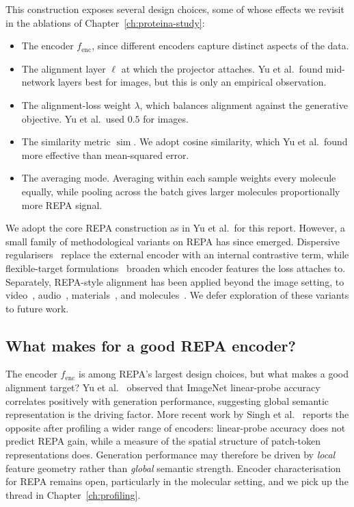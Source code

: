 \documentclass[12pt,a4paper,twoside]{report}
\begin{document}
This construction exposes several design choices, some of whose effects we revisit in the ablations of Chapter~\ref{ch:proteina-study}:
\begin{itemize}
  \item The encoder $f_{\text{enc}}$, since different encoders capture distinct aspects of the data.
  \item The alignment layer $\ell$ at which the projector attaches. Yu et al.\ found mid-network layers best for images, but this is only an empirical observation.
  \item The alignment-loss weight $\lambda$, which balances alignment against the generative objective. Yu et al.\ used $0.5$ for images.
  \item The similarity metric $\operatorname{sim}$. We adopt cosine similarity, which Yu et al.\ found more effective than mean-squared error.
  \item The averaging mode. Averaging within each sample weights every molecule equally, while pooling across the batch gives larger molecules proportionally more REPA signal.
\end{itemize}

We adopt the core REPA construction as in Yu et al.\ for this report. However, a small family of methodological variants on REPA has since emerged. Dispersive regularisers~\cite{DiffuseDisperse} replace the external encoder with an internal contrastive term, while flexible-target formulations~\cite{REED} broaden which encoder features the loss attaches to. Separately, REPA-style alignment has been applied beyond the image setting, to video~\cite{VideoREPA}, audio~\cite{TARO}, materials~\cite{CrystalREPA}, and molecules~\cite{BoltzREPA}. We defer exploration of these variants to future work.

\subsection{What makes for a good REPA encoder?}
\label{sec:encoder-characterisation}


The encoder $f_{\text{enc}}$ is among REPA's largest design choices, but what makes a good alignment target? Yu et al.~\cite{REPA} observed that ImageNet linear-probe accuracy correlates positively with generation performance, suggesting global semantic representation is the driving factor. More recent work by Singh et al.~\cite{SpatialStructure} reports the opposite after profiling a wider range of encoders: linear-probe accuracy does not predict REPA gain, while a measure of the spatial structure of patch-token representations does. Generation performance may therefore be driven by \emph{local} feature geometry rather than \emph{global} semantic strength. Encoder characterisation for REPA remains open, particularly in the molecular setting, and we pick up the thread in Chapter~\ref{ch:profiling}.
\end{document}
